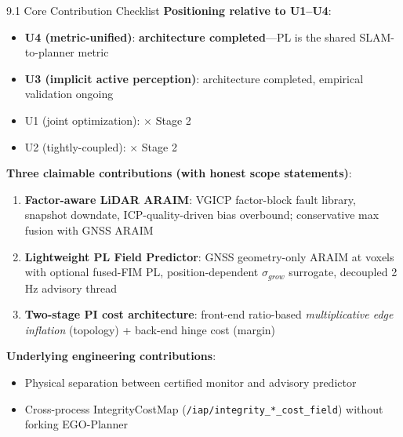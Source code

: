 \documentclass[10pt,aspectratio=169,xcolor=dvipsnames]{beamer}
\newcommand{\1}{\mathbb{1}}
\newcommand{\innov}[1]{\textcolor{NavyBlue}{\textbf{#1}}}
\begin{document}
\begin{frame}{9.1 Core Contribution Checklist}
  \small
  \textbf{Positioning relative to U1--U4}:
  \begin{itemize}
    \item \innov{U4 (metric-unified)}: \checkmark \textbf{architecture completed}---PL is the shared SLAM-to-planner metric
    \item \innov{U3 (implicit active perception)}: \checkmark architecture completed, empirical validation ongoing
    \item U1 (joint optimization): $\times$ Stage 2
    \item U2 (tightly-coupled): $\times$ Stage 2
  \end{itemize}

  \medskip
  \textbf{Three claimable contributions (with honest scope statements)}:
  \begin{enumerate}\small
    \item \innov{Factor-aware LiDAR ARAIM}: VGICP factor-block fault library, snapshot downdate, ICP-quality-driven bias overbound; conservative max fusion with GNSS ARAIM
    \item \innov{Lightweight PL Field Predictor}: GNSS geometry-only ARAIM at voxels with optional fused-FIM PL, position-dependent $\sigma_{grow}$ surrogate, decoupled 2 Hz advisory thread
    \item \innov{Two-stage PI cost architecture}: front-end ratio-based \emph{multiplicative edge inflation} (topology) + back-end hinge cost (margin)
  \end{enumerate}

  \textbf{Underlying engineering contributions}:
  \begin{itemize}\scriptsize
    \item Physical separation between certified monitor and advisory predictor
    \item Cross-process IntegrityCostMap (\texttt{/iap/integrity\_*\_cost\_field}) without forking EGO-Planner
  \end{itemize}
\end{frame}
\end{document}
